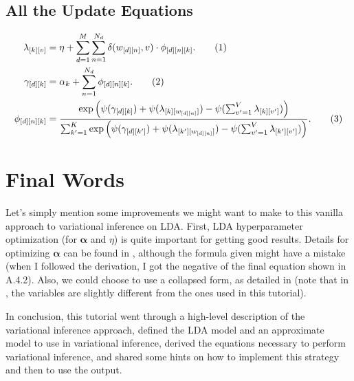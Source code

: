 \documentclass[12pt]{article}
\newcommand\numberthis{\addtocounter{equation}{1}\tag{\theequation}}
\begin{document}
\subsection{All the Update Equations}

\begin{align*}
    \lambda_{[k][v]} &= \eta + \sum_{d=1}^{M} \sum_{n=1}^{N_{d}}
    \delta(w_{[d][n]}, v)\cdot\phi_{[d][n][k]}.
    \numberthis\label{eq:lambdaupdate}
    \\*
    \gamma_{[d][k]} &= \alpha_{k} + \sum_{n=1}^{N_{d}} \phi_{[d][n][k]}.
    \numberthis\label{eq:gammaupdate}
    \\*
    \phi_{[d][n][k]} &= \frac{\exp \left( \psi(\gamma_{[d][k]})
    +
    \psi(\lambda_{[k][w_{[d][n]}]}) - \psi(\sum_{v'=1}^{V} \lambda_{[k][v']})
    \right)}
    {\sum_{k'=1}^{K} \exp \left( \psi(\gamma_{[d][k']})
    +
    \psi(\lambda_{[k'][w_{[d][n]}]}) - \psi(\sum_{v'=1}^{V}
    \lambda_{[k'][v']})
    \right)}.\numberthis\label{eq:phiupdate}
\end{align*}




\section{Final Words}

Let's simply mention some improvements we might want to make to this vanilla
approach to variational inference on LDA.  First, LDA hyperparameter
optimization (for $\bm{\alpha}$ and $\eta$) is quite important for getting good
results.  Details for optimizing $\bm{\alpha}$ can be found in
\autocite{Blei:2003:LDA}, although the formula given might have a mistake (when
I followed the derivation, I got the negative of the final equation shown in
A.4.2).  Also, we could choose to use a collapsed form, as detailed in
\autocite{collapsedvariational} (note that in \autocite{collapsedvariational},
the variables are slightly different from the ones used in this tutorial).

In conclusion, this tutorial went through a high-level description of the
variational inference approach, defined the LDA model and an approximate model
to use in variational inference, derived the equations necessary to perform
variational inference, and shared some hints on how to implement this strategy
and then to use the output.

\printbibliography
\end{document}
